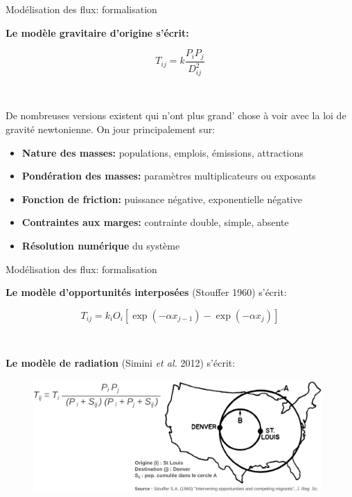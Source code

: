 \begin{frame}{Modélisation des flux: formalisation}

\textbf{Le modèle gravitaire d'origine s'écrit:}

\begin{equation}
\nonumber
T_{ij} = k \frac{P_i P_j}{D_{ij}^{2}}
\end{equation}

~

De nombreuses versions existent qui n'ont plus grand' chose à voir avec la loi de gravité newtonienne. On jour principalement sur:

\begin{itemize}
  \item \textbf{Nature des masses:} populations, emplois, émissions, attractions
  \item \textbf{Pondération des masses:} paramètres multiplicateurs ou exposants
  \item \textbf{Fonction de friction:} puissance négative, exponentielle  négative
  \item \textbf{Contraintes aux marges:} contrainte double, simple, absente
  \item \textbf{Résolution numérique} du système
\end{itemize}


\end{frame}


\begin{frame}{Modélisation des flux: formalisation}

\textbf{Le modèle d'opportunités interposées} (Stouffer 1960) s'écrit:

\begin{equation}
\nonumber
T_{ij} = k_i O_i \left[\exp(-\alpha x_{j-1}) - \exp(-\alpha x_{j}) \right]
\end{equation}

~

\textbf{Le modèle de radiation} (Simini \textit{et al.} 2012) s'écrit:  

\begin{figure}
  \includegraphics[width = 110mm]{CercleStouffer.pdf}
\end{figure}

\end{frame}


